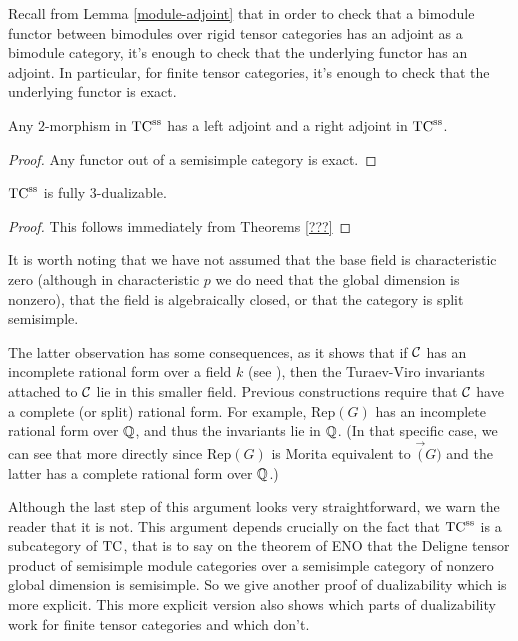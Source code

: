 \documentclass{amsart}
\begin{document}
Recall from Lemma \ref{module-adjoint} that in order to check that a bimodule functor between bimodules over rigid tensor categories has an adjoint as a bimodule category, it's enough to check that the underlying functor has an adjoint.  In particular, for finite tensor categories, it's enough to check that the underlying functor is exact.

\begin{theorem}
Any $2$-morphism in ${\mathrm{TC}^{\text{ss}}}$ has a left adjoint and a right adjoint in ${\mathrm{TC}^{\text{ss}}}$.
\end{theorem}
\begin{proof}
Any functor out of a semisimple category is exact.
\end{proof}

\begin{corollary}
 ${\mathrm{TC}^{\text{ss}}}$ is fully 3-dualizable.
\end{corollary}
\begin{proof}
This follows immediately from Theorems \ref{???}
\end{proof}

\begin{remark}
It is worth noting that we have not assumed that the base field is characteristic zero (although in characteristic $p$ we do need that the global dimension is nonzero), that the field is algebraically closed, or that the category is split semisimple.  

The latter observation has some consequences, as it shows that if $\mathcal C$ has an incomplete rational form over a field $k$ (see \cite{???}), then the Turaev-Viro invariants attached to $\mathcal C$ lie in this smaller field.  Previous constructions require that $\mathcal C$ have a complete (or split) rational form.  For example, $\mathrm{Rep}(G)$ has an incomplete rational form over $\mathbb Q$, and thus the invariants lie in $\mathbb Q$.  (In that specific case, we can see that more directly since $\mathrm{Rep}(G)$ is Morita equivalent to $\Vec(G)$ and the latter has a complete rational form over $\mathbb Q$.)
\end{remark}

Although the last step of this argument looks very straightforward, we warn the reader that it is not.  This argument depends crucially on the fact that ${\mathrm{TC}^{\text{ss}}}$ is a subcategory of $\mathrm{TC}$, that is to say on the theorem of ENO that the Deligne tensor product of semisimple module categories over a semisimple category of nonzero global dimension is semisimple.  So we give another proof of dualizability which is more explicit.  This more explicit version also shows which parts of dualizability work for finite tensor categories and which don't.
\end{document}
